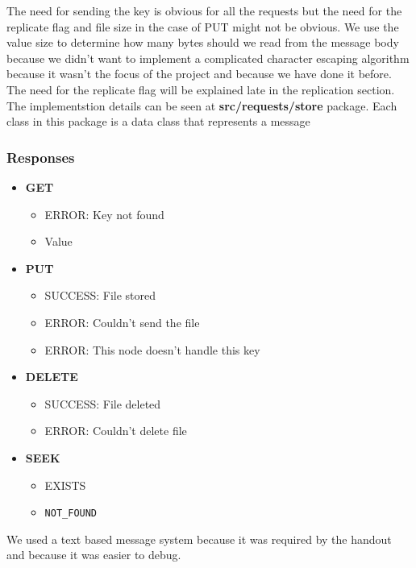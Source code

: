 The need for sending the key is obvious for all the requests but the need for the replicate flag and file size in the case of PUT might not be obvious. We use the value size to determine how many bytes should we read from the message body because we didn’t want to implement a complicated character escaping algorithm because it wasn’t the focus of the project and because we have done it before. The need for the replicate flag will be explained late in the replication section. The implementstion details can be seen at \textbf{src/requests/store} package. Each class in this package is a data class that represents a message

\subsubsection{Responses}
\begin{itemize}
    \item[] \textbf{GET}
    \begin{itemize}
        \item ERROR: Key not found
        \item Value
    \end{itemize}
    \item[] \textbf{PUT}
    \begin{itemize}
        \item SUCCESS: File stored
        \item ERROR: Couldn't send the file
        \item ERROR: This node doesn't handle this key
    \end{itemize}
    \item[] \textbf{DELETE}
        \begin{itemize}
            \item SUCCESS: File deleted
            \item ERROR: Couldn't delete file
        \end{itemize}
    \item[] \textbf{SEEK}
        \begin{itemize}
            \item EXISTS
            \item \begin{verbatim}NOT_FOUND\end{verbatim}
        \end{itemize}
\end{itemize}

We used a text based message system because it was required by the handout and because it was easier to debug.

